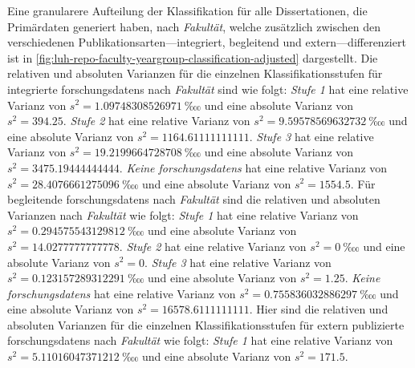 Eine granularere Aufteilung der Klassifikation für alle Dissertationen, die Primärdaten generiert haben, nach \textit{Fakultät}, welche zusätzlich zwischen den verschiedenen Publikationsarten---integriert, begleitend und extern---differenziert ist in \cref{fig:luh-repo-faculty-yeargroup-classification-adjusted} dargestellt.
%
Die relativen und absoluten Varianzen für die einzelnen Klassifikationsstufen für integrierte \glspl{forschungsdaten} nach \textit{Fakultät} sind wie folgt:
\textit{Stufe 1} hat eine relative Varianz von $s^2=\SI[round-mode=places,round-precision=3]{1.09748308526971}{‱}$ und eine absolute Varianz von $s^2=\num[round-mode=places,round-precision=3]{394.25}$.
\textit{Stufe 2} hat eine relative Varianz von $s^2=\SI[round-mode=places,round-precision=3]{9.59578569632732}{‱}$ und eine absolute Varianz von $s^2=\num[round-mode=places,round-precision=3]{1164.61111111111}$.
\textit{Stufe 3} hat eine relative Varianz von $s^2=\SI[round-mode=places,round-precision=3]{19.2199664728708}{‱}$ und eine absolute Varianz von $s^2=\num[round-mode=places,round-precision=3]{3475.19444444444}$.
\textit{Keine \glspl{forschungsdaten}} hat eine relative Varianz von $s^2=\SI[round-mode=places,round-precision=3]{28.4076661275096}{‱}$ und eine absolute Varianz von $s^2=\num[round-mode=places,round-precision=3]{1554.5}$.
%
Für begleitende \glspl{forschungsdaten} nach \textit{Fakultät} sind die relativen und absoluten Varianzen nach \textit{Fakultät} wie folgt:
\textit{Stufe 1} hat eine relative Varianz von $s^2=\SI[round-mode=places,round-precision=3]{0.294575543129812}{‱}$ und eine absolute Varianz von $s^2=\num[round-mode=places,round-precision=3]{14.0277777777778}$.
\textit{Stufe 2} hat eine relative Varianz von $s^2=\SI[round-mode=places,round-precision=3]{0}{‱}$ und eine absolute Varianz von $s^2=\num[round-mode=places,round-precision=3]{0}$.
\textit{Stufe 3} hat eine relative Varianz von $s^2=\SI[round-mode=places,round-precision=3]{0.123157289312291}{‱}$ und eine absolute Varianz von $s^2=\num[round-mode=places,round-precision=3]{1.25}$.
\textit{Keine \glspl{forschungsdaten}} hat eine relative Varianz von $s^2=\SI[round-mode=places,round-precision=3]{0.755836032886297}{‱}$ und eine absolute Varianz von $s^2=\num[round-mode=places,round-precision=3]{16578.6111111111}$.
%
Hier sind die relativen und absoluten Varianzen für die einzelnen Klassifikationsstufen für extern publizierte \glspl{forschungsdaten} nach \textit{Fakultät} wie folgt:
\textit{Stufe 1} hat eine relative Varianz von $s^2=\SI[round-mode=places,round-precision=3]{5.11016047371212}{‱}$ und eine absolute Varianz von $s^2=\num[round-mode=places,round-precision=3]{171.5}$.
